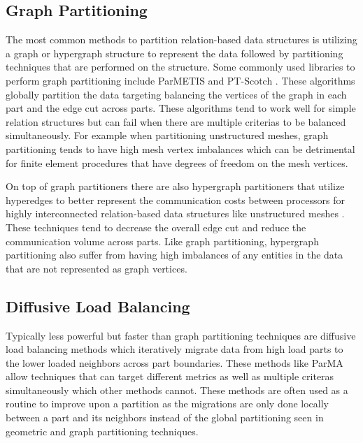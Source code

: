 \documentclass[a4paper]{article}
\begin{document}
\subsection{Graph Partitioning}
The most common methods to partition relation-based data structures is utilizing a graph or hypergraph structure to represent the data followed by partitioning techniques that are performed on the structure. Some commonly used libraries to perform graph partitioning include ParMETIS \cite{parmetis4} and PT-Scotch \cite{scotch2009}. These algorithms globally partition the data targeting balancing the vertices of the graph in each part and the edge cut across parts. These algorithms tend to work well for simple relation structures but can fail when there are multiple criterias to be balanced simultaneously. For example when partitioning unstructured meshes, graph partitioning tends to have high mesh vertex imbalances which can be detrimental for finite element procedures that have degrees of freedom on the mesh vertices. 

On top of graph partitioners there are also hypergraph partitioners that utilize hyperedges to better represent the communication costs between processors for highly interconnected relation-based data structures like unstructured meshes \cite{devine2002zoltan}. These techniques tend to decrease the overall edge cut and reduce the communication volume across parts. Like graph partitioning, hypergraph partitioning also suffer from having high imbalances of any entities in the data that are not represented as graph vertices. 

\subsection{Diffusive Load Balancing}
Typically less powerful but faster than graph partitioning techniques are diffusive load balancing methods which iteratively migrate data from high load parts to the lower loaded neighbors across part boundaries. These methods like ParMA \cite{SmithParma2015} allow techniques that can target different metrics as well as multiple criteras simultaneously which other methods cannot. These methods are often used as a routine to improve upon a partition as the migrations are only done locally between a part and its neighbors instead of the global partitioning seen in geometric and graph partitioning techniques.
\end{document}
